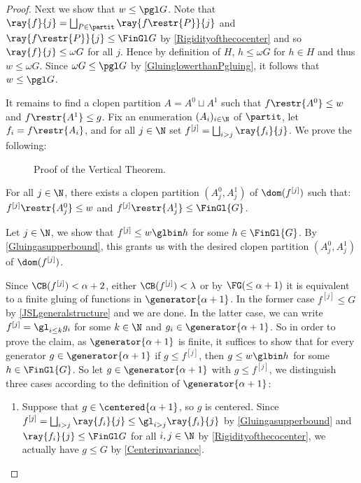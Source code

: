 \begin{proof}
\smallskip

Next we show that $w\leq \pgl G$.  Note that $\ray{f}{j}=\bigsqcup_{P\in \partit} \ray{f\restr{P}}{j}$ and $\ray{f\restr{P}}{j} \leq \FinGl G$ by \cref{Rigidityofthecocenter} and so $\ray{f}{j}\leq \omega G$ for all $j$.
Hence by definition of $H$, {$h\leq \omega G$ for $h\in H$ and thus $w\leq \omega G$}. Since $\omega G\leq \pgl G$ by \cref{GluinglowerthanPgluing}, it follows that  $w\leq \pgl G$.

It remains to find a clopen partition $A=A^0\sqcup A^1$ such that $f\restr{A^0}\leq w$ and $f\restr{A^1}\leq g$.
Fix an enumeration $(A_i)_{i\in\N}$ of $\partit$, let $f_i=f\restr{A_i}$, and for all $j\in\N$ set $f^{[j]}=\bigsqcup_{i>j} \ray{f_i}{j}$. We prove the following:

\begin{figure}
\centering
{}

\caption{Proof of the Vertical Theorem.}
\end{figure}
\begin{claim}
For all $j\in \N$, there exists a clopen partition $(A^0_j, A^1_j)$ of $\dom(f^{[j]})$
such that:  $f^{[j]}\restr{A^0_j}\leq w$ and $f^{[j]}\restr{A^1_j}\leq \FinGl{G}$.
\end{claim}
\begin{subproof}
Let $j\in \N$, we show that $f^{[j]}\leq w \glbin h$ for some $h\in\FinGl{G}$.
By \cref{Gluingasupperbound}, this grants us with the desired clopen partition $(A^0_j, A^1_j)$ of $\dom(f^{[j]})$. 

Since $\CB(f^{[j]})< \alpha+2$, either $\CB(f^{[j]})< \lambda$ or by $\FG(\leq\alpha+1)$ it is equivalent to a finite gluing of functions in $\generator{\alpha+1}$.
In the former case $f^{[j]}\leq G$ by \cref{JSLgeneralstructure} and we are done.
In the latter case, we can write $f^{[j]}=\gl_{i\leq k}g_i$ for some $k\in\N$ and $g_i\in\generator{\alpha+1}$.
So in order to prove the claim, as $\generator{\alpha+1}$ is finite, it suffices to show that for every generator $g\in \generator{\alpha+1}$ if $g\leq f^{[j]}$, then $g \leq w \glbin h$ for some $h\in\FinGl{G}$.
So let $g\in \generator{\alpha+1}$ with $g\leq f^{[j]}$, we distinguish three cases according to the definition of $ \generator{\alpha+1}$:
\begin{enumerate}
\item Suppose that $g\in \centered{\alpha+1}$, so $g$ is centered. Since $f^{[j]}=\bigsqcup_{i>j} \ray{f_i}{j}\leq \gl_{i>j}\ray{f_i}{j}$ by \cref{Gluingasupperbound}
and $\ray{f_i}{j}\leq \FinGl G$ for all $i,j\in\N$ by \cref{Rigidityofthecocenter}, we actually have $g\leq G$ by \cref{Centerinvariance}.


\end{enumerate}
\end{subproof}
\end{proof}
